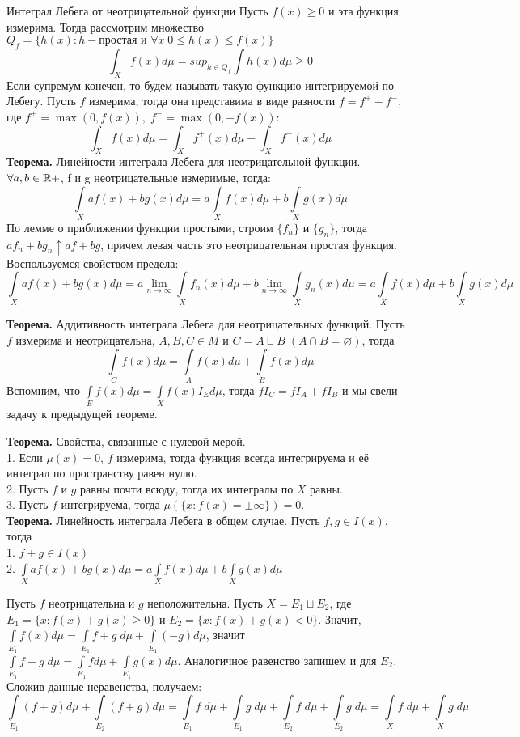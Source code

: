 \Def Интеграл Лебега от неотрицательной функции 
Пусть $f(x) \geq 0$ и эта функция измерима. Тогда рассмотрим множество $Q_f = \{ h(x): h - \text{простая и } \forall x \; 0 \leq h(x) \leq f(x) \}$
\[\int_X f(x) d\mu = sup_{h \in Q_f }\int h(x) d \mu \geq 0\]Если супремум конечен, то будем называть такую функцию интегрируемой по Лебегу.
\Def Пусть $f$ измерима, тогда она представима в виде разности $f = f^+ - f^-$, где $f^+ = \max(0, f(x)), \; f^- = \max(0, -f(x))$:
\[\int_X f(x) d\mu = \int_X f^+(x) d\mu -  \int_X f^-(x) d\mu\]
\textbf{Теорема.} Линейности интеграла Лебега для неотрицательной функции. $\forall a, b \in \mathbb{R}+$, f и g неотрицательные измеримые, тогда:
\[\int\limits_X a f(x) + bg(x) d \mu = a  \int\limits_X  f(x) d \mu +b  \int\limits_X  g(x) d \mu\]
\Proof
По лемме о приближении функции простыми, строим $\{f_n\}$ и $\{g_n\}$, тогда $a f_n + b g_n\uparrow a f + b g$, причем левая часть это неотрицательная простая функция. Воспользуемся свойством предела:
\[\int\limits_X a f(x) + bg(x) d \mu = a  \lim\limits_{n\rightarrow \infty} \int\limits_X f_n(x) d \mu +b  \lim\limits_{n\rightarrow \infty} \int\limits_X g_n(x) d \mu = a   \int\limits_X f(x) d \mu +b  \int\limits_X g(x) d \mu \]\EndProof


\textbf{Теорема.} Аддитивность интеграла Лебега для неотрицательных функций.
Пусть $f$ измерима и неотрицательна, $A, B, C \in M$ и $C = A \sqcup B\; (A\cap B = \varnothing)$, тогда
\[\int\limits_C  f(x)  d \mu =   \int\limits_A  f(x) d \mu +  \int\limits_B  f(x)  d \mu\]
\Proof
Вспомним, что $\int\limits_E  f(x)  d \mu =   \int\limits_X  f(x) I_E d \mu$, тогда $f I_C = f I_A + f I_B$ и мы свели задачу к предыдущей теореме. \EndProof

\textbf{Теорема.} Свойства, связанные с нулевой мерой.\\
1. Если $\mu(x) = 0$, $f$ измерима, тогда функция всегда интегрируема и её интеграл по пространству равен нулю.\\
2. Пусть $f$  и $g$ равны почти всюду, тогда их интегралы по $X$ равны.\\
3.  Пусть $f$ интегрируема, тогда $\mu(\{x: f(x) = \pm \infty\}) = 0$.\\

\textbf{Теорема.} Линейность интеграла Лебега в общем случае.
Пусть $f, g \in I(x)$, тогда\\
1.  $f+g \in I(x)$ \\
2. $\int\limits_X a f(x) + bg(x) d \mu = a  \int\limits_X  f(x) d \mu +b  \int\limits_X  g(x) d \mu$

\Proof
Пусть $f$ неотрицательна и $g$ неположительна. Пусть $X = E_1 \sqcup E_2$, где  $E_1 = \{x: f(x) + g(x) \geq 0\}$ и $E_2 = \{x: f(x) + g(x) < 0\}$. Значит, $\int\limits_{E_1}  f(x)  d \mu =   \int\limits_{E_1}  f  + g \; d \mu +  \int\limits_{E_1}  (-g) d\mu$, значит $\int\limits_{E_1}  f +g \; d \mu =   \int\limits_{E_1}  f  d \mu +  \int\limits_{E_1} g(x) d\mu$. Аналогичное равенство запишем и для $E_2$. Сложив данные неравенства, получаем:
 \[\int\limits_{E_1}  (f+g)  d \mu + \int\limits_{E_2}  (f+g)  d \mu =   \int\limits_{E_1}  f\; d \mu  + \int\limits_{E_1}  g \; d \mu+ \int\limits_{E_2}  f\; d \mu  + \int\limits_{E_2}  g \; d \mu =  \int\limits_{X}  f\; d \mu  + \int\limits_{X}  g \; d \mu \] \EndProof

